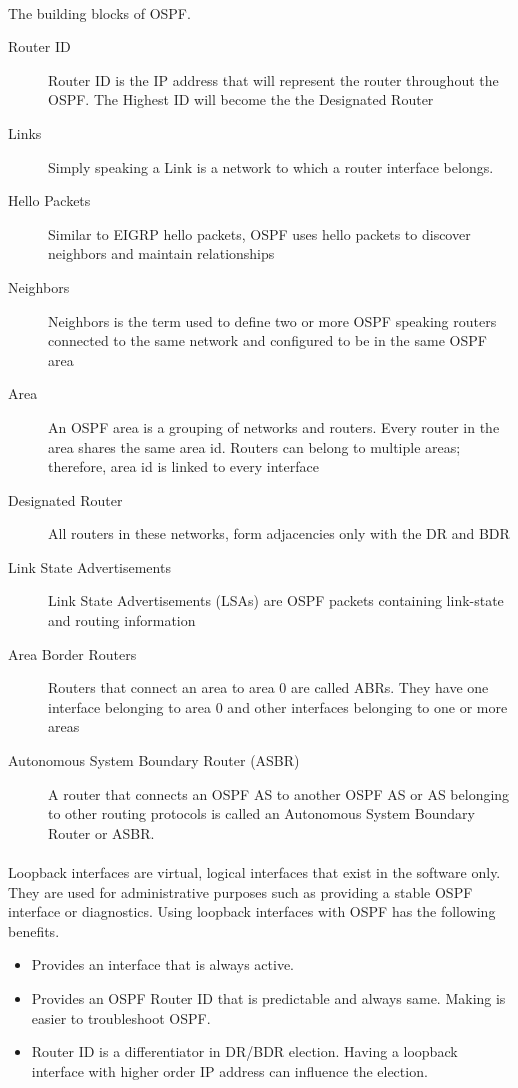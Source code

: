 \documentclass[10pt,landscape]{article}
\begin{document}
\begin{multicols}{3}
\paragraph{}
The building blocks of OSPF.
\begin{description}
	\item[Router ID] Router ID is the IP address that will represent the router throughout the OSPF. The Highest ID will become the the Designated Router
	\item[Links] Simply speaking a Link is a network to which a router interface belongs.
	\item[Hello Packets] Similar to EIGRP hello packets, OSPF uses hello packets to discover neighbors and maintain relationships 
	\item[Neighbors]  Neighbors is the term used to define two or more OSPF speaking routers connected to the same network and configured to be in the same OSPF area
	\item[Area] An OSPF area is a grouping of networks and routers. Every router in the area shares the same area id. Routers can belong to multiple areas; therefore, area id is linked to every interface
	\item[Designated Router] All routers in these networks, form adjacencies only with the DR and BDR
	\item[Link State Advertisements] Link State Advertisements (LSAs) are OSPF packets containing link-state and routing information
	\item[Area Border Routers] Routers that connect an area to area 0 are called ABRs. They have one interface belonging to area 0 and other interfaces belonging to one or more areas
	\item[Autonomous System Boundary Router (ASBR)] A router that connects an OSPF AS to another OSPF AS or AS belonging to other routing protocols is called an Autonomous System Boundary Router or ASBR.
\end{description}
\paragraph{}
Loopback interfaces are virtual, logical interfaces that exist in the software only. They are used for administrative purposes such as providing a stable OSPF interface or diagnostics. Using loopback interfaces with OSPF has the following benefits.
\begin{itemize}
    \item Provides an interface that is always active.
    \item Provides an OSPF Router ID that is predictable and always same. Making is easier to troubleshoot OSPF.
    \item Router ID is a differentiator in DR/BDR election. Having a loopback interface with higher order IP address can influence the election.
\end{itemize}

\end{multicols}
\end{document}
